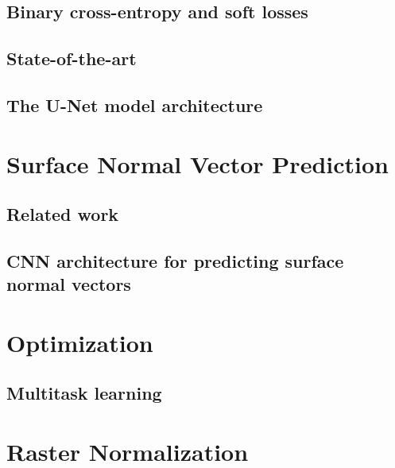 \subsection{Binary cross-entropy and soft losses}

\subsection{State-of-the-art}%
\label{sec:segmentation-state-of-the-art}

\subsection{The U-Net model architecture}%
\label{sec:unet}

\clearpage

\section{Surface Normal Vector Prediction}\label{sec:surface-raster-model}

\subsection{Related work}\label{sec:normal-vector-literature}

\subsection{CNN architecture for predicting surface normal vectors}%
\label{sec:normal-model}


\section{Optimization}\label{sec:optimization}

\subsection{Multitask learning}\label{sec:multitask-learning}


\section{Raster Normalization}%
\label{sec:raster-normalization}

